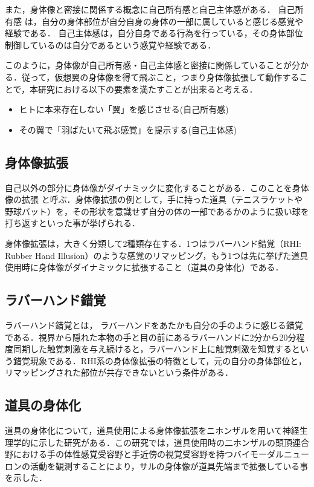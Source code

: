 \begin{small}
    また，身体像と密接に関係する概念に自己所有感と自己主体感がある．
    自己所有感 は，自分の身体部位が自分自身の身体の一部に属していると感じる感覚や経験である．
    自己主体感は，自分自身である行為を行っている，その身体部位制御しているのは自分であるという感覚や経験である．

    このように，身体像が自己所有感・自己主体感と密接に関係していることが分かる．従って，仮想翼の身体像を得て飛ぶこと，つまり身体像拡張して動作することで，本研究における以下の要素を満たすことが出来ると考える．

    \begin{itemize}
        \item ヒトに本来存在しない「翼」を感じさせる(自己所有感)
        \item その翼で「羽ばたいて飛ぶ感覚」を提示する(自己主体感)
    \end{itemize}

  \subsection{身体像拡張}

    自己以外の部分に身体像がダイナミックに変化することがある．このことを身体像の拡張
    と呼ぶ．身体像拡張の例として，手に持った道具（テニスラケットや野球バット）を，その形状を意識せず自分の体の一部であるかのように扱い球を打ち返すといった事が挙げられる．

    身体像拡張は，大きく分類して2種類存在する．1つはラバーハンド錯覚（RHI: Rubber Hand Illusion）\cite{botvinick1998rubber}のような感覚のリマッピング，もう1つは先に挙げた道具使用時に身体像がダイナミックに拡張すること（道具の身体化）である．

    \subsection{ラバーハンド錯覚} %
      ラバーハンド錯覚とは， ラバーハンドをあたかも自分の手のように感じる錯覚である．視界から隠れた本物の手と目の前にあるラバーハンドに2分から20分程度同期した触覚刺激を与え続けると，ラバーハンド上に触覚刺激を知覚するという錯覚現象である．RHI系の身体像拡張の特徴として，元の自分の身体部位と，リマッピングされた部位が共存できないという条件がある．

    \subsection{道具の身体化} %
      道具の身体化について，道具使用による身体像拡張をニホンザルを用いて神経生理学的に示した研究がある\cite{iriki1996coding}．この研究では，道具使用時の二ホンザルの頭頂連合野における手の体性感覚受容野と手近傍の視覚受容野を持つバイモーダルニューロンの活動を観測することにより，サルの身体像が道具先端まで拡張している事を示した．


\end{small}
